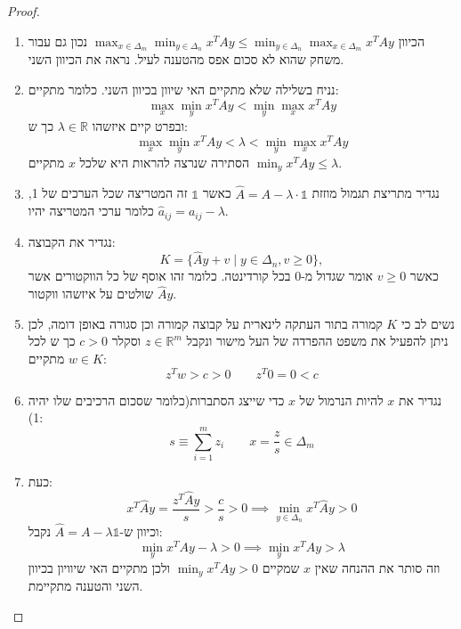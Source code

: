 \documentclass{tstextbook}
\begin{document}
\begin{proof}
  \begin{enumerate}
    \item הכיוון \(\operatorname*{max}_{x\in\Delta_{m}}\operatorname*{min}_{y\in\Delta_{n}}x^{T}A y\leq\operatorname*{min}_{y\in\Delta_{n}}\operatorname*{max}_{x\in\Delta_{m}}x^{T}A y\) נכון גם עבור משחק שהוא לא סכום אפס מהטענה לעיל. נראה את הכיוון השני. 


    \item נניח בשלילה שלא מתקיים האי שיוון בכיוון השני. כלומר מתקיים: 
$$\operatorname*{max}_{x}\operatorname*{min}_{y}x^{T}A y<\operatorname*{min}_{y}\operatorname*{max}_{x}x^{T}A y$$
ובפרט קיים איזשהו \(\lambda \in \mathbb{R}\) כך ש:
$$\operatorname*{max}_{x}\operatorname*{min}_{y}x^{T}A y<\lambda<\operatorname*{min}_{y}\operatorname*{max}_{x}x^{T}A y$$
הסתירה שנרצה להראות היא שלכל \(x\) מתקיים \(\operatorname*{min}_{y}x^{T}A y\leq\lambda\).


    \item נגדיר מתריצת תגמול מוזזת \(\hat{A}=A-\lambda \cdot \mathbb{1}\) כאשר \(\mathbb{1}\) זה המטריצה שכל הערכים של 1, כלומר ערכי המטריצה יהיו \(\hat{a}_{ij}=a_{ij}-\lambda\). 


    \item נגדיר את הקבוצה: 
$$K=\{\hat{A}y+v\mid y\in\Delta_{n},v\geq0\},$$
כאשר \(v\geq 0\) אומר שגדול מ-0 בכל קורדינטה. כלומר זהו אוסף של כל הווקטורים אשר שולטים על איזשהו ווקטור \(\hat{A}y\).


    \item נשים לב כי \(K\) קמורה בתור העתקה לינארית על קבוצה קמורה וכן סגורה באופן דומה, לכן ניתן להפעיל את משפט ההפרדה של העל מישור ונקבל \(z \in \mathbb{R}^{m}\) וסקלר \(c> 0\) כך ש לכל \(w \in K\) מתקיים: 
$$z^{T}w>c> 0 \qquad  z^{T}0=0<c$$


    \item נגדיר את \(x\) להיות הנרמול של \(x\) כדי שייצג הסתברות(כלומר שסכום הרכיבים שלו יהיה 1): 
$$s \equiv \sum_{i=1}^{m} z_{i}\qquad x=\frac{z}{s}\in \Delta_{m}$$


    \item כעת: 
$$x^{T}\hat{A}y=\frac{z^{T}\hat{A}y}{s}>\frac{c}{s}>0\implies \operatorname*{min}_{y\in\Delta_{n}}x^{T}{\hat{A}}y>0$$
וכיוון ש-\(\hat{A}=A-\lambda \mathbb{1}\) נקבל:
$$\operatorname*{min}_{y}x^{T}A y-\lambda>0\implies\operatorname*{min}_{y}x^{T}A y>\lambda$$
וזה סותר את ההנחה שאין \(x\) שמקיים \(\min_{y}x^{T}Ay> 0\) ולכן מתקיים האי שיוויון בכיוון השני והטענה מתקיימת.


  \end{enumerate}
\end{proof}
\end{document}
